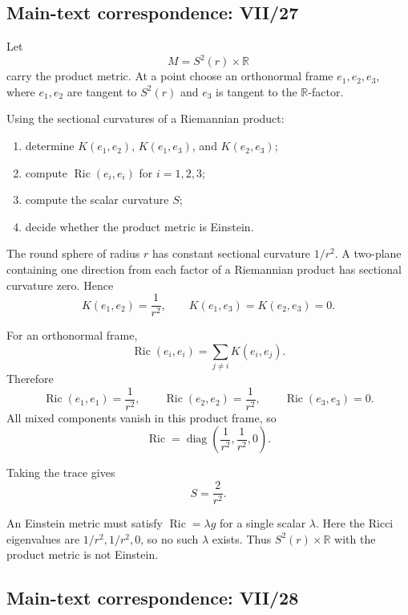 \subsection*{Main-text correspondence: VII/27}

\begin{problem}
\label{prob:cp-vii-0077}
Let
\[
M=S^2(r)\times\mathbb{R}
\]
carry the product metric.  At a point choose an orthonormal frame
\(e_1,e_2,e_3\), where \(e_1,e_2\) are tangent to \(S^2(r)\) and
\(e_3\) is tangent to the \(\mathbb{R}\)-factor.

Using the sectional curvatures of a Riemannian product:

\begin{enumerate}
\item determine \(K(e_1,e_2)\), \(K(e_1,e_3)\), and \(K(e_2,e_3)\);
\item compute \(\operatorname{Ric}(e_i,e_i)\) for \(i=1,2,3\);
\item compute the scalar curvature \(S\);
\item decide whether the product metric is Einstein.
\end{enumerate}
\end{problem}

\begin{solution}
The round sphere of radius \(r\) has constant sectional curvature
\(1/r^2\).  A two-plane containing one direction from each factor of a
Riemannian product has sectional curvature zero.  Hence
\[
K(e_1,e_2)=\frac1{r^2},
\qquad
K(e_1,e_3)=K(e_2,e_3)=0.
\]

For an orthonormal frame,
\[
\operatorname{Ric}(e_i,e_i)
 =\sum_{j\ne i}K(e_i,e_j).
\]
Therefore
\[
\operatorname{Ric}(e_1,e_1)=\frac1{r^2},
\qquad
\operatorname{Ric}(e_2,e_2)=\frac1{r^2},
\qquad
\operatorname{Ric}(e_3,e_3)=0.
\]
All mixed components vanish in this product frame, so
\[
\operatorname{Ric}
=
\operatorname{diag}\!\left(\frac1{r^2},\frac1{r^2},0\right).
\]

Taking the trace gives
\[
S=\frac2{r^2}.
\]

An Einstein metric must satisfy \(\operatorname{Ric}=\lambda g\) for a
single scalar \(\lambda\).  Here the Ricci eigenvalues are
\(1/r^2,1/r^2,0\), so no such \(\lambda\) exists.  Thus
\(S^2(r)\times\mathbb{R}\) with the product metric is not Einstein.
\end{solution}

\subsection*{Main-text correspondence: VII/28}

